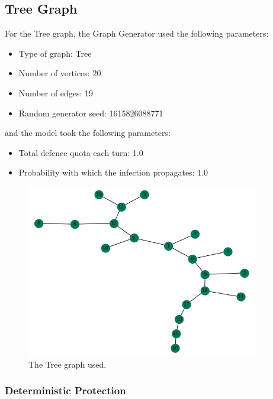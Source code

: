 \documentclass[results.tex]{subfiles}
\begin{document}
\newpage

\subsection{Tree Graph}

For the Tree graph, the Graph Generator used the following parameters:

\begin{itemize}
\item Type of graph: Tree
\item Number of vertices: 20
\item Number of edges: 19
\item Random generator seed: 1615826088771
\end{itemize}
and the model took the following parameters:
\begin{itemize}
\item Total defence quota each turn: 1.0
\item Probability with which the infection propagates: 1.0
\end{itemize}

\begin{figure}[!ht]
	\centering
	\includegraphics[width=0.9\textwidth]{tree.jpg}
	\caption{The Tree graph used.}
	\label{fig:tree}
\end{figure}

\subsubsection{Deterministic Protection}



\newpage
\end{document}
